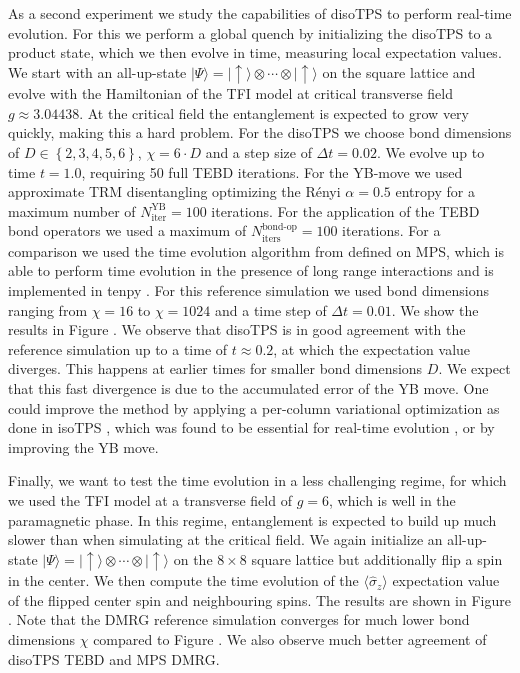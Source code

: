 
As a second experiment we study the capabilities of disoTPS to perform real-time evolution. For this we perform a global quench by initializing the disoTPS to a product state, which we then evolve in time, measuring local expectation values. We start with an all-up-state $|\Psi\rangle = |\uparrow\rangle\otimes\cdots\otimes|\uparrow\rangle$ on the square lattice and evolve with the Hamiltonian of the TFI model at critical transverse field $g \approx 3.04438$. At the critical field the entanglement is expected to grow very quickly, making this a hard problem. For the disoTPS we choose bond dimensions of $D\in\left\{2, 3, 4, 5, 6\right\}$, $\chi = 6\cdot D$ and a step size of $\Delta t = 0.02$. We evolve up to time $t = 1.0$, requiring 50 full TEBD iterations. For the YB-move we used approximate TRM disentangling optimizing the Rényi $\alpha = 0.5$ entropy for a maximum number of $N_\text{iter}^\text{YB} = 100$ iterations. For the application of the TEBD bond operators we used a maximum of $N_\text{iters}^\text{bond-op} = 100$ iterations. For a comparison we used the time evolution algorithm from \cite{cite:time_evolving_a_mps_with_long_range_interactions} defined on MPS, which is able to perform time evolution in the presence of long range interactions and is implemented in tenpy \cite{cite:tenpy}. For this reference simulation we used bond dimensions ranging from $\chi = 16$ to $\chi= 1024$ and a time step of $\Delta t = 0.01$. We show the results in Figure . We observe that disoTPS is in good agreement with the reference simulation up to a time of $t\approx0.2$, at which the expectation value diverges. This happens at earlier times for smaller bond dimensions $D$. We expect that this fast divergence is due to the accumulated error of the YB move. One could improve the method by applying a per-column variational optimization as done in isoTPS \cite{cite:isometric_tensor_network_states_in_two_dimensions, cite:efficient_simulation_of_dynamics_in_two_dimensional_quantum_spin_systems}, which was found to be essential for real-time evolution \cite{cite:efficient_simulation_of_dynamics_in_two_dimensional_quantum_spin_systems}, or by improving the YB move. \par

Finally, we want to test the time evolution in a less challenging regime, for which we used the TFI model at a transverse field of $g = 6$, which is well in the paramagnetic phase. In this regime, entanglement is expected to build up much slower than when simulating at the critical field. We again initialize an all-up-state $|\Psi\rangle = |\uparrow\rangle\otimes\cdots\otimes|\uparrow\rangle$ on the $8\times8$ square lattice but additionally flip a spin in the center. We then compute the time evolution of the $\langle\hat{\sigma}_z\rangle$ expectation value of the flipped center spin and neighbouring spins. The results are shown in Figure . Note that the DMRG reference simulation converges for much lower bond dimensions $\chi$ compared to Figure . We also observe much better agreement of disoTPS TEBD and MPS DMRG.